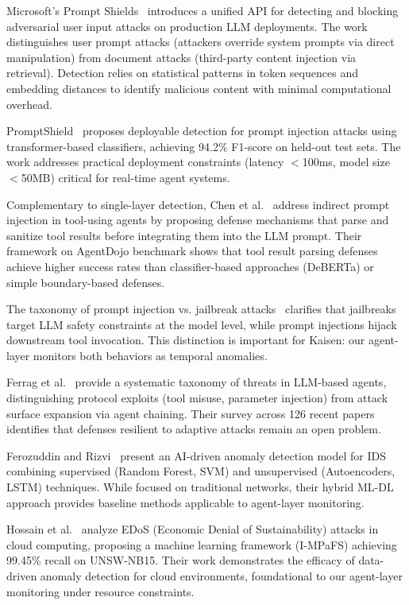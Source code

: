 \documentclass[conference]{IEEEtran}
\begin{document}
Microsoft's Prompt Shields~\cite{microsoft2024jailbreak} introduces a unified API for detecting and blocking adversarial user input attacks on production LLM deployments. The work distinguishes user prompt attacks (attackers override system prompts via direct manipulation) from document attacks (third-party content injection via retrieval). Detection relies on statistical patterns in token sequences and embedding distances to identify malicious content with minimal computational overhead.

PromptShield~\cite{promptshield2025detection} proposes deployable detection for prompt injection attacks using transformer-based classifiers, achieving 94.2\% F1-score on held-out test sets. The work addresses practical deployment constraints (latency $<$100ms, model size $<$50MB) critical for real-time agent systems.

Complementary to single-layer detection, Chen et al.~\cite{chen2025prompt} address indirect prompt injection in tool-using agents by proposing defense mechanisms that parse and sanitize tool results before integrating them into the LLM prompt. Their framework on AgentDojo benchmark shows that tool result parsing defenses achieve higher success rates than classifier-based approaches (DeBERTa) or simple boundary-based defenses.

The taxonomy of prompt injection vs. jailbreak attacks~\cite{promptfoo2025taxonomy} clarifies that jailbreaks target LLM safety constraints at the model level, while prompt injections hijack downstream tool invocation. This distinction is important for Kaisen: our agent-layer monitors both behaviors as temporal anomalies.

Ferrag et al.~\cite{ferrag2025protocol} provide a systematic taxonomy of threats in LLM-based agents, distinguishing protocol exploits (tool misuse, parameter injection) from attack surface expansion via agent chaining. Their survey across 126 recent papers identifies that defenses resilient to adaptive attacks remain an open problem.

Ferozuddin and Rizvi~\cite{ferozuddin2025ai} present an AI-driven anomaly detection model for IDS combining supervised (Random Forest, SVM) and unsupervised (Autoencoders, LSTM) techniques. While focused on traditional networks, their hybrid ML-DL approach provides baseline methods applicable to agent-layer monitoring.

Hossain et al.~\cite{hossain2024edos} analyze EDoS (Economic Denial of Sustainability) attacks in cloud computing, proposing a machine learning framework (I-MPaFS) achieving 99.45\% recall on UNSW-NB15. Their work demonstrates the efficacy of data-driven anomaly detection for cloud environments, foundational to our agent-layer monitoring under resource constraints.
\end{document}
